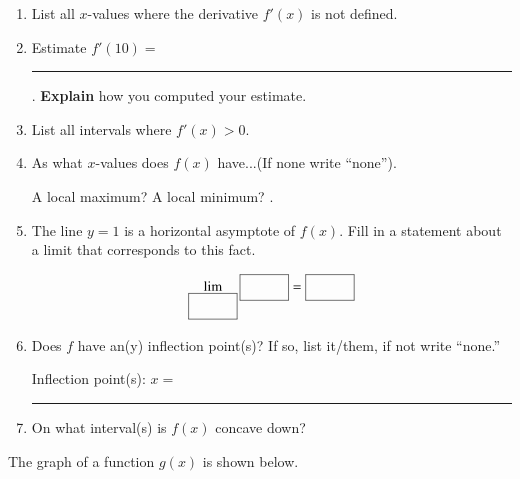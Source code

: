 \documentclass[12pt]{article}
\renewcommand{\emph}[1]{\textsf{\textbf{#1}}}
\newcommand{\blank}[1]{\rule{#1}{0.75pt}}
\let\ds\displaystyle
\newcounter{probcount}
\newcounter{subprobcount}
\def\problem#1{\setcounter{subprobcount}{0}%
\addtocounter{probcount}{1}{\emph{\arabic{probcount}.\hskip 1em(#1)}}\par}
\newenvironment{subproblems}{%
\begin{enumerate}%
\setcounter{enumi}{\value{subprobcount}}%
\renewcommand{\theenumi}{\emph{\alph{enumi}}}}%
{\setcounter{subprobcount}{\value{enumi}}\end{enumerate}}
\begin{document}
\begin{subproblems}
\item List all $x$-values where the derivative $f'(x)$ is not defined. 
\hrulefill
\item Estimate $f'(10)=$\blank{1cm}. \textbf{Explain} how you computed your estimate.

\vspace{1in}

\item List all intervals where $f'(x) >0$. \hrulefill
\item As what $x$-values does $f(x)$ have...(If none write ``none'').

 A local maximum? \hrulefill A local minimum? \hrulefill. 
 \item The line $y = 1$ is a horizontal asymptote of $f(x)$. Fill in a statement about a limit that corresponds to this fact.
 
\[\lim_{\fbox{\strut\hspace{1cm}}} \fbox{\strut\hspace{1cm}} = \fbox{\strut\hspace{1cm}}\]

 
 \item Does $f$ have an(y) inflection point(s)? If so, list it/them, if not write ``none.''
 
 Inflection point(s): $x = $ \blank{1.5 cm}
 
\item On what interval(s) is $f(x)$ concave down? \hrulefill
 \end{subproblems}

\newpage

\problem{6 points}
The graph of a function $g(x)$ is shown below.
\begin{center}
\end{center}
\end{document}
